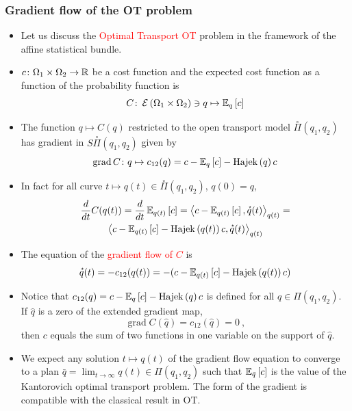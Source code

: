\documentclass[xcolor=svgnames]{beamer}
\DeclareMathOperator{\Hajek}{Hajek}
\DeclareMathOperator{\grad}{grad}
\newcommand{\hajekof}[1]{\Hajek\left(#1\right)}
\newcommand{\openplan}[2]{\overset{\circ}\Pi\left(#1,#2\right)}
\newcommand{\rosso}[1]{\textcolor{red}{#1}}
\renewcommand{\emph}{\rosso}
\begin{document}
\begin{frame}\small\frametitle{Gradient flow of the OT problem}

\begin{itemize}
    \item 
Let us discuss the \emph{Optimal Transport OT} problem in the framework of the affine statistical bundle.
\item $c \colon \Omega_1 \times \Omega_2 \to \mathbb{R}$ be a cost function and the expected cost function as a function of the probability function is
\begin{equation*}
  C \colon \operatorname{\mathcal E}\left(\Omega_1 \times \Omega_2\right) \ni q \mapsto \operatorname{\mathbb E}_{q}\left[c\right]
\end{equation*}
\item The function $q \mapsto C(q)$ restricted to the open transport model $\openplan{q_1}{q_2}$ has gradient in $S\openplan{q_1}{q_2}$ given by
\begin{equation*}
 \grad C \colon q \mapsto c_{12}(q) = c - \expectat q c - \hajekof q c 
\end{equation*}
\item In fact for all curve $t \mapsto q(t) \in \openplan {q_1}{q_2}$, $q(0) = q$,
\begin{multline*}
\derivby t C(q(t)) = \derivby t \expectat {q(t)} c = \scalarat {q(t)} {c - \expectat {q(t)} c}{\velocity q(t)} = \\
\scalarat {q(t)} {c - \expectat {q(t)} c - \hajekof {q(t)} c}{\velocity q(t)}
\end{multline*}

\item The equation of the \emph{gradient flow of $C$} is
\begin{equation*}
  \velocity q(t) = - c_{12}(q(t)) = - (c - \expectat {q(t)} c - \hajekof {q(t)} c)
\end{equation*}

\item Notice that  $c_{12}(q) = c - \expectat q c - \hajekof {q} c$ is defined for  all $q \in \Pi(q_1,q_2)$. If $\hat q$ is a zero of the extended gradient map,
\begin{equation*}
    \grad C(\hat q) = c_{12}(\hat q) = 0 \ ,
\end{equation*}
then $c$ equals the sum of two functions in one variable on the support of $\hat q$.
\item
We expect any solution $t \mapsto q(t)$ of the gradient flow equation to converge to a plan $\bar q = \lim_{t \to \infty} q(t) \in \Pi(q_1,q_2)$ such that $\operatorname{\mathbb E}_{\bar q}\left[c\right]$ is the value of the Kantorovich optimal transport problem. The form of the gradient is compatible with the classical result in OT.
\end{itemize}
\end{frame}
\end{document}
